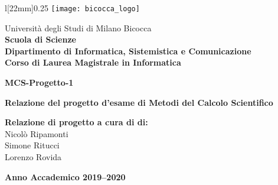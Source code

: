 \begin{titlepage}
\begin{onehalfspace}
	\begin{wrapfigure}[4]{l}[22mm]{0.25\textwidth}
		\vspace*{-7mm}
		\centering
		\texttt{[image: bicocca\_logo]}
	\end{wrapfigure}
	\par
	\noindent Università degli Studi di Milano Bicocca \\
	\textbf{Scuola di Scienze \\
			Dipartimento di Informatica, Sistemistica e Comunicazione \\
			Corso di Laurea Magistrale in Informatica}
\end{onehalfspace}

\vfill
\par

\begin{doublespace}
\begin{center}
	{\Huge \textbf{MCS-Progetto-1}}
\end{center}
\end{doublespace}

\vfill
\par

\begin{onehalfspace}
\begin{center}
	{\large \textbf{Relazione del progetto d'esame di Metodi del Calcolo Scientifico}}
\end{center}

\vspace{8mm}
\par

\begin{flushright}
	{\large \textbf{Relazione di progetto a cura di di:} \\
			Nicolò Ripamonti \\Simone Ritucci \\Lorenzo Rovida}
			
\end{flushright}
\end{onehalfspace}

\vfill
\par

\begin{center}
	{\large \textbf{Anno Accademico 2019--2020}}
\end{center}

\end{titlepage}